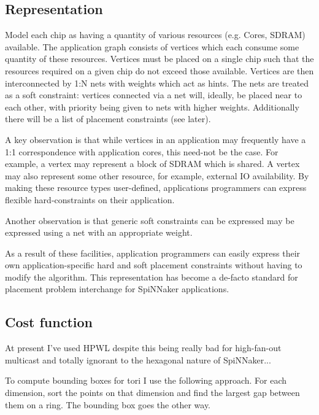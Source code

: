 		\subsection{Representation}
			
			Model each chip as having a quantity of various resources (e.g. Cores,
			SDRAM) available. The application graph consists of vertices which each
			consume some quantity of these resources. Vertices must be placed on a
			single chip such that the resources required on a given chip do not
			exceed those available. Vertices are then interconnected by 1:N nets with
			weights which act as hints. The nets are treated as a soft constraint:
			vertices connected via a net will, ideally, be placed near to each other,
			with priority being given to nets with higher weights. Additionally there
			will be a list of placement constraints (see later).
			
			A key observation is that while vertices in an application may frequently
			have a 1:1 correspondence with application cores, this need-not be the
			case. For example, a vertex may represent a block of SDRAM which is
			shared. A vertex may also represent some other resource, for example,
			external IO availability. By making these resource types user-defined,
			applications programmers can express flexible hard-constraints on their
			application.
			
			Another observation is that generic soft constraints can be expressed may
			be expressed using a net with an appropriate weight.
			
			As a result of these facilities, application programmers can easily
			express their own application-specific hard and soft placement
			constraints without having to modify the algorithm. This representation
			has become a de-facto standard for placement problem interchange for
			SpiNNaker applications.
		
		\subsection{Cost function}
			
			At present I've used HPWL despite this being really bad for high-fan-out
			multicast and totally ignorant to the hexagonal nature of SpiNNaker...
			
			To compute bounding boxes for tori I use the following approach. For each
			dimension, sort the points on that dimension and find the largest gap
			between them on a ring. The bounding box goes the other way.
			
